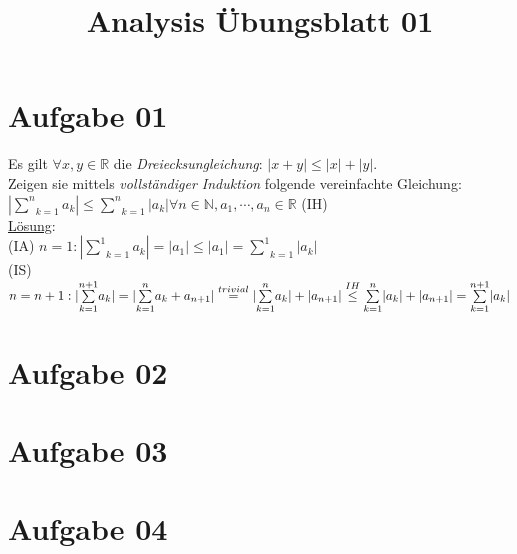 \documentclass[a4paper,11pt]{article}
\title{Analysis Übungsblatt 01}
\begin{document}
\maketitle

\section{Aufgabe 01}
Es gilt $\forall x,y\in\mathbb{R}$ die \emph{Dreiecksungleichung}: $|x+y|\leq|x|+|y|$.\\
Zeigen sie mittels \emph{vollständiger Induktion} folgende vereinfachte Gleichung:\\
$|\underset{k=1}{\overset{n}{\sum}}a_k|\leq\underset{k=1}{\overset{n}{\sum}}|a_k|\forall n\in\mathbb{N},a_1,\cdots,a_n\in\mathbb{R}$ (IH)\\
\underline{Lösung}:\\
(IA) $n=1: |\underset{k=1}{\overset{1}{\sum}}a_k|=|a_1|\leq|a_1|=\underset{k=1}{\overset{1}{\sum}}|a_k|$\\
(IS) $n=n+1:|\underset{k=1}{\overset{n+1}{\sum}}a_k|=|\underset{k=1}{\overset{n}{\sum}}a_k+a_{n+1}|\overset{trivial}{=}|\underset{k=1}{\overset{n}{\sum}}a_k|+|a_{n+1}|\\
\overset{IH}{\leq}\underset{k=1}{\overset{n}{\sum}}|a_k|+|a_{n+1}|=\underset{k=1}{\overset{n+1}{\sum}}|a_k|$
\section{Aufgabe 02}
\section{Aufgabe 03}
\section{Aufgabe 04}
\end{document}
